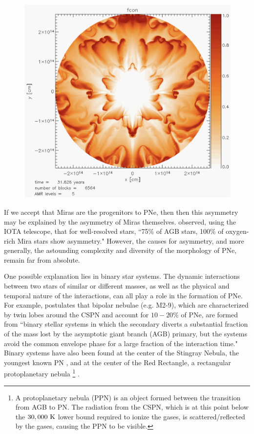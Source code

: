 \documentclass[twocolumn]{aastex63}
\begin{document}
\begin{figure}[ht]
    \includegraphics[width=\textwidth]{dust_condensation.png}
\end{figure}

If we accept that Miras are the progenitors to PNe, then then this asymmetry may be explained by the asymmetry of Miras themselves. \cite{ragland} observed, using the IOTA telescope, that for well-resolved stars, ``75\% of AGB stars, 100\% of oxygen-rich Mira stars show asymmetry." However, the causes for asymmetry, and more generally, the astounding complexity and diversity of the morphology of PNe, remain far from absolute. 

One possible explanation lies in binary star systems. The dynamic interactions between two stars of similar or different masses, as well as the physical and temporal nature of the interactions, can all play a role in the formation of PNe. For example, \cite{soker1998} postulates that bipolar nebulae (e.g. M2-9), which are characterized by twin lobes around the CSPN and account for $10-20\%$ of PNe, are formed from ``binary stellar systems in which the secondary diverts a substantial fraction of the mass lost by the asymptotic giant branch (AGB) primary, but the systems avoid the common envelope phase for a large fraction of the interaction time." Binary systems have also been found at the center of the Stingray Nebula, the youngest known PN \citep{bobrowsky}, and at the center of the Red Rectangle, a rectangular protoplanetary nebula \footnote{A protoplanetary nebula (PPN) is an object formed between the transition from AGB to PN. The radiation from the CSPN, which is at this point below the $30,000~{\rm K}$ lower bound required to ionize the gases, is scattered/reflected by the gases, causing the PPN to be visible.} \citep{cohen}.
\end{document}
